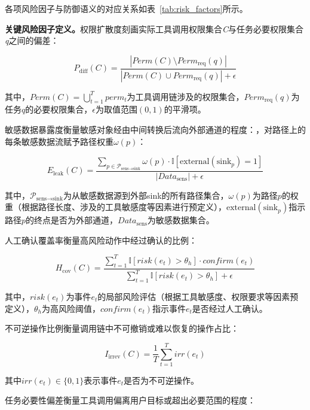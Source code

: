 各项风险因子与防御语义的对应关系如表~\ref{tab:risk_factors}所示。



\textbf{关键风险因子定义。}权限扩散度刻画实际工具调用权限集合\emph{C}与任务必要权限集合\emph{q}之间的偏差：

\begin{equation}
  P_{\text{diff}}(C) = \frac{|Perm(C) \setminus Perm_{\text{req}}(q)|}{|Perm(C) \cup Perm_{\text{req}}(q)| + \epsilon}
\end{equation}

其中，$Perm(C) = \bigcup_{t=1}^{T} perm_t$为工具调用链涉及的权限集合，$Perm_{\text{req}}(q)$为任务$q$的必要权限集合，$\epsilon$为取值范围$(0,1)$的平滑项。

敏感数据暴露度衡量敏感对象经由中间转换后流向外部通道的程度：，对路径上的每条敏感数据流赋予路径权重$\omega(p)$：

\begin{equation}
  E_{\text{leak}}(C) = \frac{\sum_{p \in \mathcal{P}_{\text{sens}\to\text{sink}}} \omega(p) \cdot \mathbb{I}[\text{external}(\text{sink}_p) = 1]}{|Data_{\text{sens}}| + \epsilon}
\end{equation}

其中，$\mathcal{P}_{\text{sens}\to\text{sink}}$为从敏感数据源到外部sink的所有路径集合，$\omega(p)$为路径$p$的权重（根据路径长度、涉及的工具敏感度等因素进行预定义），$\text{external}(\text{sink}_p)$指示路径$p$的终点是否为外部通道，$Data_{\text{sens}}$为敏感数据集合。

人工确认覆盖率衡量高风险动作中经过确认的比例：

\begin{equation}
  H_{\text{cov}}(C) = \frac{\sum_{t=1}^{T} \mathbb{I}[risk(e_t) > \theta_h] \cdot confirm(e_t)}{\sum_{t=1}^{T} \mathbb{I}[risk(e_t) > \theta_h] + \epsilon}
\end{equation}

其中，$risk(e_t)$为事件$e_t$的局部风险评估（根据工具敏感度、权限要求等因素预定义），$\theta_h$为高风险阈值，$confirm(e_t)$指示事件$e_t$是否经过人工确认。

不可逆操作比例衡量调用链中不可撤销或难以恢复的操作占比：

\begin{equation}
  I_{\text{irrev}}(C) = \frac{1}{T} \sum_{t=1}^{T} irr(e_t)
\end{equation}

其中$irr(e_t) \in \{0,1\}$表示事件$e_t$是否为不可逆操作。

任务必要性偏差衡量工具调用偏离用户目标或超出必要范围的程度：

